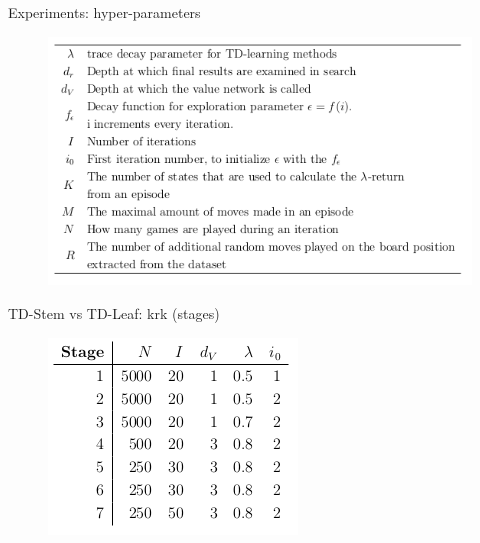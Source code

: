 \documentclass{beamer}
\begin{document}
\begin{frame}{Experiments: hyper-parameters}
	\begin{figure}
		\includegraphics[scale=0.5]{hyper}
	\end{figure}
\end{frame}

\begin{frame}{TD-Stem vs TD-Leaf: krk (stages)}
	\begin{figure}
		\includegraphics[scale=0.5]{exp1}
	\end{figure}
\end{frame}
\end{document}
